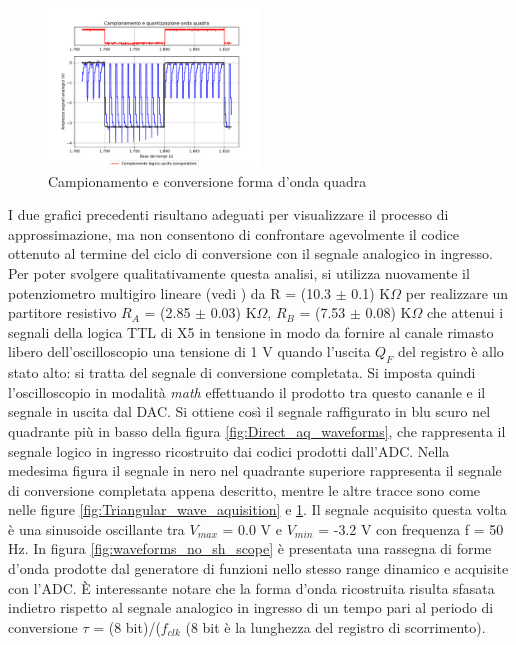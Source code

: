 \documentclass[journal]{IEEEtran}
\begin{document}
\begin{figure}[H]%
\begin{center}
\includegraphics[trim = {0 25 0 0},clip, width=0.50\textwidth]{analysis/output/square_wave_aq.pdf}
\caption{Campionamento e conversione forma d'onda quadra}
\label{fig:Square_wave_aquisition}
\end{center}
\end{figure}

I due grafici precedenti risultano adeguati per visualizzare il processo di approssimazione, ma non consentono di confrontare agevolmente il codice ottenuto al termine del ciclo di conversione con il segnale analogico in ingresso. Per poter svolgere qualitativamente questa analisi, si utilizza nuovamente il potenziometro multigiro lineare (vedi \cite{K}) da R = (10.3 $\pm$ 0.1) K$\Omega$ per realizzare un partitore resistivo $R_A$ = (2.85 $\pm$ 0.03) K$\Omega$, $R_B$ = (7.53 $\pm$ 0.08) K$\Omega$ che attenui i segnali della logica TTL di X5 in tensione in modo da fornire al canale rimasto libero dell'oscilloscopio una tensione di 1 V quando l'uscita $Q_F$ del registro è allo stato alto: si tratta del segnale di conversione completata. Si imposta quindi l'oscilloscopio in modalità \textit{math} effettuando il prodotto tra questo cananle e il segnale in uscita dal DAC. Si ottiene così il segnale raffigurato in blu scuro nel quadrante più in basso della figura \ref{fig:Direct_aq_waveforms}, che rappresenta il segnale logico in ingresso ricostruito dai codici prodotti dall'ADC. Nella medesima figura il segnale in nero nel quadrante superiore rappresenta il segnale di conversione completata appena descritto, mentre le altre tracce sono come nelle figure \ref{fig:Triangular_wave_aquisition} e \ref{fig:Square_wave_aquisition}. Il segnale acquisito questa volta è una sinusoide oscillante tra $V_{max}$ = 0.0 V e $V_{min}$ = -3.2 V con frequenza f = 50 Hz. In figura \ref{fig:waveforms_no_sh_scope} è presentata una rassegna di forme d'onda prodotte dal generatore di funzioni nello stesso range dinamico e acquisite con l'ADC. È interessante notare che la forma d'onda ricostruita risulta sfasata indietro rispetto al segnale analogico in ingresso di un tempo pari al periodo di conversione $\tau$ = (8 bit)/($f_{clk}$ (8 bit è la lunghezza del registro di scorrimento).
\end{document}
